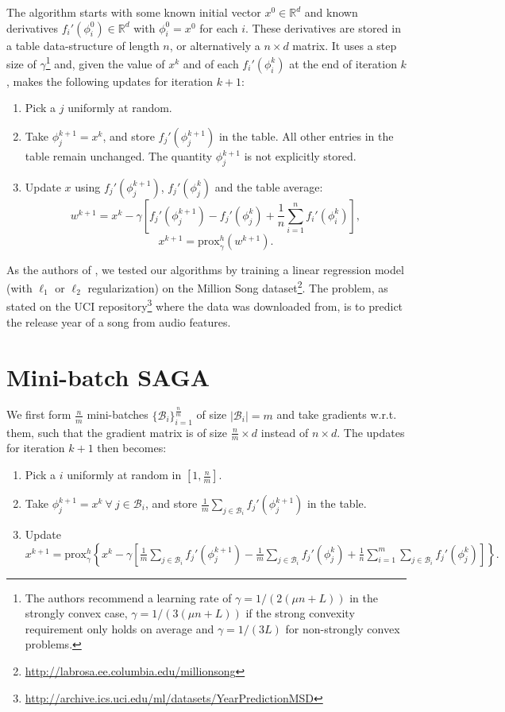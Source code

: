 \documentclass[a4paper,11pt]{article}
\newcommand{\R}{\mathbb{R}}
\newcommand{\B}{\mathcal{B}}
\newcommand{\prox}{\textrm{prox}}
\begin{document}
The algorithm starts with some known initial vector $x^0 \in \R^d$ and known
derivatives $f_i' (\phi_i^0) \in \R^d$ with $\phi_i^0 = x^0$ for each $i$. These
derivatives are stored in a table data-structure of length $n$, or alternatively
a $n \times d$ matrix. It uses a step size of $\gamma$\footnote{The authors
recommend a learning rate of $\gamma=1/(2(\mu n+L))$ in the strongly convex
case, $\gamma=1/(3(\mu n+L))$ if the strong convexity requirement only holds on
average and $\gamma=1/(3L)$ for non-strongly convex problems.} and, given the
value of $x^k$ and of each $f_i' (\phi_i^k)$ at the end of iteration $k$, makes
the following updates for iteration $k+1$:
\begin{enumerate}
\item Pick a $j$ uniformly at random.
\item Take $\phi_j^{k+1} = x^k$, and store $f_j'(\phi_j^{k+1})$ in the table.
	All other entries in the table remain unchanged. The quantity $\phi_j^{k+1}$
	is not explicitly stored.
\item Update $x$ using $f_j'(\phi_j^{k+1})$, $f_j'(\phi_j^k)$ and the table
	average:
	\begin{equation} \label{eqn:saga}
	w^{k+1} = x^k - \gamma \left[ f_j'(\phi_j^{k+1}) - f_j'(\phi_j^k)
	+ \frac1n \sum_{i=1}^n f_i'(\phi_i^k) \right] ,
	\end{equation}
	$$x^{k+1} = \prox_\gamma^h (w^{k+1}).$$
\end{enumerate}

As the authors of \cite{defazio_saga_2014}, we tested our algorithms by training
a linear regression model (with $\ell_1$ or $\ell_2$ regularization) on the
Million Song dataset\footnote{
\url{http://labrosa.ee.columbia.edu/millionsong}}. The problem, as stated on the
UCI repository\footnote{
\url{http://archive.ics.uci.edu/ml/datasets/YearPredictionMSD}} where the data
was downloaded from, is to predict the release year of a song from audio
features.

\section{Mini-batch SAGA}

We first form $\frac{n}m$ mini-batches $\{\B_i\}_{i=1}^{\frac{n}m}$ of size
$|\B_i| = m$ and take gradients w.r.t. them, such that the gradient matrix is of
size $\frac{n}m \times d$ instead of $n \times d$. The updates for iteration
$k+1$ then becomes:
\begin{enumerate}
\item Pick a $i$ uniformly at random in $[1, \frac{n}m]$.
\item Take $\phi_j^{k+1} = x^k \ \forall \ j \in \B_i$, and store $\frac1m
	\sum_{j\in\B_i} f_j'(\phi_j^{k+1})$ in the table.
\item Update $x^{k+1} = \prox_\gamma^h \left\{
	x^k - \gamma \left[ \frac1m \sum_{j\in\B_i} f_j'(\phi_j^{k+1})
	- \frac1m \sum_{j\in\B_i} f_j'(\phi_j^k)
	+ \frac1n \sum_{i=1}^m \sum_{j\in\B_i} f_j'(\phi_j^k) \right] \right\}.$
\end{enumerate}
\end{document}
